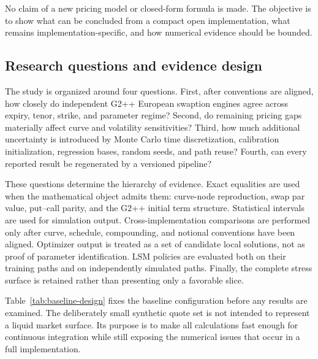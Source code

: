 \documentclass[11pt]{article}
\numberwithin{equation}{section}
\theoremstyle{definition}
\theoremstyle{remark}
\begin{document}
No claim of a new pricing model or closed-form formula is made. The objective is
to show what can be concluded from a compact open implementation, what remains
implementation-specific, and how numerical evidence should be bounded.

\subsection{Research questions and evidence design}

The study is organized around four questions. First, after conventions are
aligned, how closely do independent G2++ European swaption engines agree across
expiry, tenor, strike, and parameter regime? Second, do remaining pricing gaps
materially affect curve and volatility sensitivities? Third, how much additional
uncertainty is introduced by Monte Carlo time discretization, calibration
initialization, regression bases, random seeds, and path reuse? Fourth, can every
reported result be regenerated by a versioned pipeline?

These questions determine the hierarchy of evidence. Exact equalities are used
when the mathematical object admits them: curve-node reproduction, swap par
value, put--call parity, and the G2++ initial term structure. Statistical
intervals are used for simulation output. Cross-implementation comparisons are
performed only after curve, schedule, compounding, and notional conventions have
been aligned. Optimizer output is treated as a set of candidate local solutions,
not as proof of parameter identification. LSM policies are evaluated both on
their training paths and on independently simulated paths. Finally, the complete
stress surface is retained rather than presenting only a favorable slice.

Table~\ref{tab:baseline-design} fixes the baseline configuration before any
results are examined. The deliberately small synthetic quote set is not intended
to represent a liquid market surface. Its purpose is to make all calculations
fast enough for continuous integration while still exposing the numerical
issues that occur in a full implementation.
\end{document}

